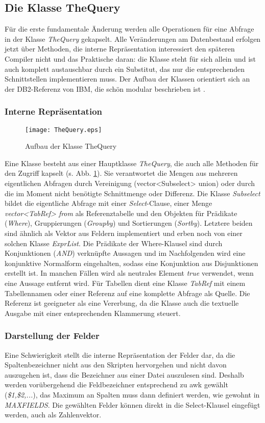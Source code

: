 \subsection{Die Klasse TheQuery}
Für die erste fundamentale Änderung werden alle Operationen für eine Abfrage in der Klasse \textit{TheQuery} gekapselt. Alle Veränderungen am Datenbestand erfolgen jetzt über Methoden, die interne Repräsentation interessiert den späteren Compiler nicht und das Praktische daran: die Klasse steht für sich allein und ist auch komplett austauschbar durch ein Substitut, das nur die entsprechenden Schnittstellen implementieren muss.
Der Aufbau der Klassen orientiert sich an der DB2-Referenz von IBM, die schön modular beschrieben ist \cite{db2}.

\subsubsection{Interne Repräsentation}
\begin{figure}[h]
\centering
\texttt{[image: TheQuery.eps]}
\caption{Aufbau der Klasse TheQuery}
\label{fig:TheQuery}
\end{figure}
Eine Klasse besteht aus einer Hauptklasse \textit{TheQuery}, die auch alle Methoden für den Zugriff kapselt (s. Abb. \ref{fig:TheQuery}). Sie verantwortet die Mengen aus mehreren eigentlichen Abfragen durch Vereinigung (vector<Subselect> union) oder durch die im Moment nicht benötigte Schnittmenge oder Differenz.
Die Klasse \textit{Subselect} bildet die eigentliche Abfrage mit einer \textit{Select}-Clause, einer Menge \textit{vector<TabRef> from} als Referenztabelle und den Objekten für Prädikate (\textit{Where}), Gruppierungen (\textit{Groupby}) und Sortierungen (\textit{Sortby}). Letztere beiden sind ähnlich als Vektor aus Feldern implementiert und erben noch von einer solchen Klasse \textit{ExprList}. Die Prädikate der Where-Klausel sind durch Konjunktionen (\textit{AND}) verknüpfte Aussagen und im Nachfolgenden wird eine konjunktive Normalform eingehalten, sodass eine Konjunktion aus Disjunktionen erstellt ist. In manchen Fällen wird als neutrales Element \textit{true} verwendet, wenn eine Aussage entfernt wird. Für Tabellen dient eine Klasse \textit{TabRef} mit einem Tabellennamen oder einer Referenz auf eine komplette Abfrage als Quelle. Die Referenz ist geeigneter als eine Vererbung, da die Klasse auch die textuelle Ausgabe mit einer entsprechenden Klammerung steuert.

\subsubsection{Darstellung der Felder}
Eine Schwierigkeit stellt die interne Repräsentation der Felder dar, da die Spaltenbezeichner nicht aus den Skripten hervorgehen und nicht davon auszugehen ist, dass die Bezeichner aus einer Datei auszulesen sind. Deshalb werden vorübergehend die Feldbezeichner entsprechend zu awk gewählt (\textit{\$1,\$2,...}), das Maximum an Spalten muss dann definiert werden, wie gewohnt in \textit{MAXFIELDS}. Die gewählten Felder können direkt in die Select-Klausel eingefügt werden, auch als Zahlenvektor.


